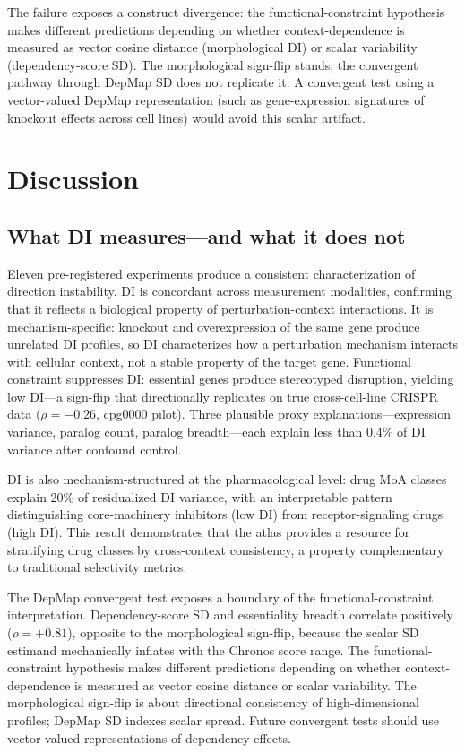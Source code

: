 \documentclass[11pt]{article}
\begin{document}
The failure exposes a construct divergence: the
functional-constraint hypothesis makes different predictions depending
on whether context-dependence is measured as vector cosine distance
(morphological DI) or scalar variability (dependency-score SD).  The
morphological sign-flip stands; the convergent pathway through DepMap SD
does not replicate it.  A convergent test using a vector-valued DepMap
representation (such as gene-expression signatures of knockout effects
across cell lines) would avoid this scalar artifact.


\section{Discussion}
\label{sec:discussion}

\subsection{What DI measures---and what it does not}

Eleven pre-registered experiments produce a consistent characterization
of direction instability.  DI is concordant across measurement
modalities, confirming that it reflects a biological property of
perturbation-context interactions.  It is mechanism-specific: knockout
and overexpression of the same gene produce unrelated DI profiles, so DI
characterizes how a perturbation mechanism interacts with cellular
context, not a stable property of the target gene.  Functional
constraint suppresses DI: essential genes produce stereotyped disruption,
yielding low DI---a sign-flip that directionally replicates on true
cross-cell-line CRISPR data ($\rho = -0.26$, cpg0000 pilot).  Three
plausible proxy explanations---expression variance, paralog count,
paralog breadth---each explain less than 0.4\% of DI variance after
confound control.

DI is also mechanism-structured at the pharmacological level: drug MoA
classes explain 20\% of residualized DI variance, with an interpretable
pattern distinguishing core-machinery inhibitors (low DI) from
receptor-signaling drugs (high DI).  This result demonstrates that the
atlas provides a resource for stratifying drug classes by cross-context
consistency, a property complementary to traditional selectivity
metrics.

The DepMap convergent test exposes a boundary of the
functional-constraint interpretation.  Dependency-score SD and
essentiality breadth correlate positively ($\rho = +0.81$), opposite to
the morphological sign-flip, because the scalar SD estimand mechanically
inflates with the Chronos score range.  The functional-constraint
hypothesis makes different predictions depending on whether
context-dependence is measured as vector cosine distance or scalar
variability.  The morphological sign-flip is about directional
consistency of high-dimensional profiles; DepMap SD indexes scalar
spread.  Future convergent tests should use vector-valued representations
of dependency effects.
\end{document}
